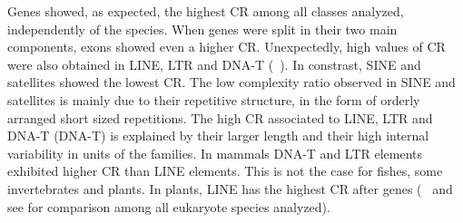 Genes showed, as expected, the highest CR among all classes analyzed, independently of the species. When genes were split in their two main components, exons showed even a higher CR. Unexpectedly, high values of CR were also obtained in LINE, LTR and DNA-T (~). In constrast, SINE and satellites showed the lowest CR. The low complexity ratio observed in SINE and satellites is mainly due to their repetitive structure, in the form of
orderly arranged short sized repetitions. The high CR associated to LINE, LTR and DNA-T (DNA-T) is explained by their larger length and their high internal variability in units of the families. In mammals DNA-T and LTR elements exhibited higher CR than LINE elements. This is not the case for fishes, some invertebrates and plants. In plants, LINE has the highest CR after genes (~ and see  for comparison among all eukaryote species analyzed).


